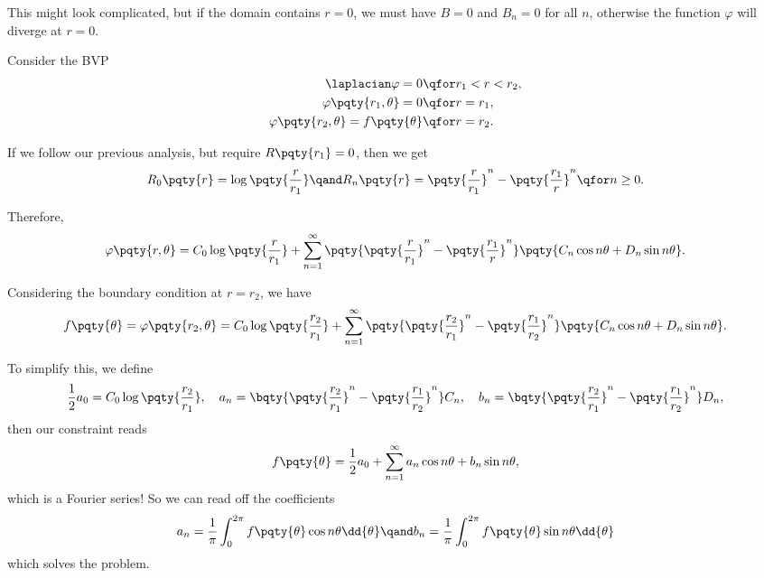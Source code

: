 {This might look complicated, but if the domain contains \(r = 0\), we must have \(B = 0\) and \(B_n = 0\) for all \(n\), otherwise the function \(\varphi\) will diverge at \(r = 0\).

\begin{example}
    Consider the BVP
    \begin{subequations}
        \begin{align}
            \laplacian \varphi = 0 &\qfor r_1 < r < r_2, \\
            \varphi\pqty{r_1, \theta} = 0 &\qfor r = r_1, \\
            \varphi\pqty{r_2, \theta} = f\pqty{\theta} &\qfor r = r_2.
        \end{align}
    \end{subequations}

    If we follow our previous analysis, but require \(R\pqty{r_1} = 0\), then we get
    \begin{equation}
        R_0 \pqty{r} = \log \pqty{\frac{r}{r_1}} \qand R_n\pqty{r} = \pqty{\frac{r}{r_1}}^n - \pqty{\frac{r_1}{r}}^n \qfor n \geq 0.
    \end{equation}
    
    Therefore,
    \begin{equation}
        \varphi\pqty{r, \theta} = C_0 \log \pqty{\frac{r}{r_1}} + \sum_{n = 1}^{\infty} \pqty{\pqty{\frac{r}{r_1}}^n - \pqty{\frac{r_1}{r}}^n} \pqty{C_n \cos n \theta + D_n \sin n \theta}.
    \end{equation}

    Considering the boundary condition at \(r = r_2\), we have
    \begin{equation}
        f\pqty{\theta} = \varphi\pqty{r_2, \theta} = C_0 \log \pqty{\frac{r_2}{r_1}} + \sum_{n = 1}^{\infty} \pqty{\pqty{\frac{r_2}{r_1}}^n - \pqty{\frac{r_1}{r_2}}^n} \pqty{C_n \cos n \theta + D_n \sin n \theta}.
    \end{equation}

    To simplify this, we define
    \begin{equation}
        \frac{1}{2} a_0 = C_0 \log\pqty{\frac{r_2}{r_1}}, \quad a_n = \bqty{\pqty{\frac{r_2}{r_1}}^n - \pqty{\frac{r_1}{r_2}}^n} C_n, \quad b_n = \bqty{\pqty{\frac{r_2}{r_1}}^n - \pqty{\frac{r_1}{r_2}}^n} D_n,
    \end{equation}
    then our constraint reads
    \begin{equation}
        f\pqty{\theta} = \frac{1}{2} a_0 + \sum_{n = 1}^{\infty} a_n \cos n \theta + b_n \sin n \theta,
    \end{equation}
    which is a Fourier series! So we can read off the coefficients
    \begin{equation}
        a_n = \frac{1}{\pi} \int_{0}^{2 \pi} f\pqty{\theta} \cos n \theta \dd{\theta} \qand b_n = \frac{1}{\pi} \int_{0}^{2 \pi} f\pqty{\theta} \sin n \theta \dd{\theta}
    \end{equation}
    which solves the problem.
\end{example}

}
